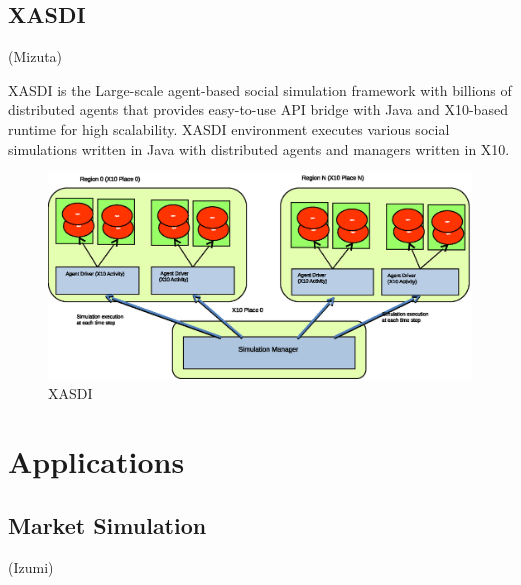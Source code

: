 \subsection{XASDI}
\label{ss:XASDI}
(Mizuta)

XASDI is the Large-scale agent-based social simulation framework with
billions of distributed agents that provides easy-to-use API bridge
with Java and X10-based runtime for high scalability. XASDI
environment executes various social simulations written in Java with
distributed agents and managers written in X10.

\begin{figure}
  \centering
  \includegraphics[width=.8\linewidth]{Figs.noda/figure-04.xasdi.eps}
  \caption{XASDI}
  \label{fig:Figs.noda/figure-04.xasdi.eps}
\end{figure}

\section{Applications}
\label{s:Applications}

\subsection{Market Simulation}
\label{ss:Market Simulation}
(Izumi)

